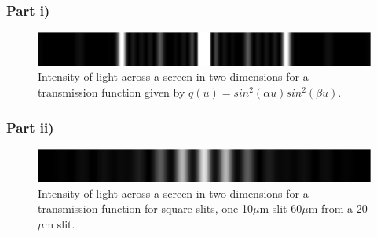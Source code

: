 \documentclass[a4paper,12pt]{article}
\begin{document}
\subsubsection{Part i)}

\begin{figure}[H]
\centering
\includegraphics[width = \linewidth]{lab2q4ei.png}
\caption{Intensity of light across a screen in two dimensions for a transmission function given by $q(u) = sin^2(\alpha u) sin^2(\beta u)$.}
\label{fig:q4ei}
\end{figure}

\subsubsection{Part ii)}

\begin{figure}[H]
\centering
\includegraphics[width = \linewidth]{lab2q4eii.png}
\caption{Intensity of light across a screen in two dimensions for a transmission function for square slits, one 10$\mu$m slit 60$\mu$m from a 20$\mu$m slit.}
\label{fig:q4eii}
\end{figure}
\end{document}
